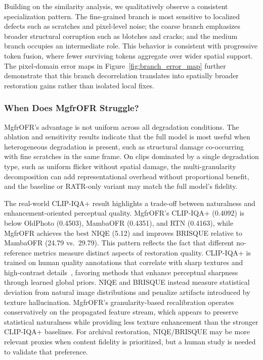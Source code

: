 Building on the similarity analysis, we qualitatively observe a consistent specialization pattern. The fine-grained branch is most sensitive to localized defects such as scratches and pixel-level noise; the coarse branch emphasizes broader structural corruption such as blotches and cracks; and the medium branch occupies an intermediate role. This behavior is consistent with progressive token fusion, where fewer surviving tokens aggregate over wider spatial support. The pixel-domain error maps in Figure~\ref{fig:branch_error_map} further demonstrate that this branch decorrelation translates into spatially broader restoration gains rather than isolated local fixes.

\subsubsection{When Does MgfrOFR Struggle?}
\label{subsec:failure}

MgfrOFR's advantage is not uniform across all degradation conditions. The ablation and sensitivity results indicate that the full model is most useful when heterogeneous degradation is present, such as structural damage co-occurring with fine scratches in the same frame. On clips dominated by a single degradation type, such as uniform flicker without spatial damage, the multi-granularity decomposition can add representational overhead without proportional benefit, and the baseline or RATR-only variant may match the full model's fidelity.

The real-world CLIP-IQA+ result highlights a trade-off between naturalness and enhancement-oriented perceptual quality. MgfrOFR's CLIP-IQA+ (0.4092) is below OldPhoto (0.4503), MambaOFR (0.4351), and RTN (0.4163), while MgfrOFR achieves the best NIQE (5.12) and improves BRISQUE relative to MambaOFR (24.79 vs.\ 29.79). This pattern reflects the fact that different no-reference metrics measure distinct aspects of restoration quality. CLIP-IQA+ is trained on human quality annotations that correlate with sharp textures and high-contrast details~\cite{wang2023clipiqa}, favoring methods that enhance perceptual sharpness through learned global priors. NIQE and BRISQUE instead measure statistical deviation from natural image distributions and penalize artifacts introduced by texture hallucination. MgfrOFR's granularity-based recalibration operates conservatively on the propagated feature stream, which appears to preserve statistical naturalness while providing less texture enhancement than the stronger CLIP-IQA+ baselines. For archival restoration, NIQE/BRISQUE may be more relevant proxies when content fidelity is prioritized, but a human study is needed to validate that preference.

